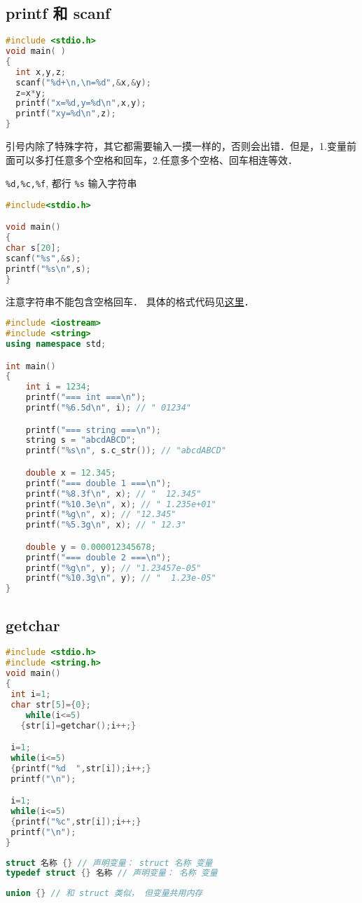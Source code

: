 

\begin{issues}
\issueDraft
\end{issues}

\subsection{printf 和 scanf}
\begin{lstlisting}[language=cpp]
#include <stdio.h>
void main( )
{
  int x,y,z;
  scanf("%d+\n,\n=%d",&x,&y);
  z=x*y;
  printf("x=%d,y=%d\n",x,y);
  printf("xy=%d\n",z);
}
\end{lstlisting}
引号内除了特殊字符，其它都需要输入一摸一样的，否则会出错．但是，1.变量前面可以多打任意多个空格和回车，2.任意多个空格、回车相连等效．
 
\verb|%d,%c,%f|, 都行 \verb|%s| 输入字符串
\begin{lstlisting}[language=cpp]
#include<stdio.h>

void main()
{
char s[20];
scanf("%s",&s);
printf("%s\n",s);
}
\end{lstlisting}
注意字符串不能包含空格回车． 具体的格式代码见\href{https://www.tutorialspoint.com/c_standard_library/c_function_printf.htm}{这里}．

\begin{lstlisting}[language=cpp]
#include <iostream>
#include <string>
using namespace std;

int main()
{
	int i = 1234;
	printf("=== int ===\n");
	printf("%6.5d\n", i); // " 01234"

	printf("=== string ===\n");
	string s = "abcdABCD";
	printf("%s\n", s.c_str()); // "abcdABCD"

	double x = 12.345;
	printf("=== double 1 ===\n");
	printf("%8.3f\n", x); // "  12.345"
	printf("%10.3e\n", x); // " 1.235e+01"
	printf("%g\n", x); // "12.345"
	printf("%5.3g\n", x); // " 12.3"

	double y = 0.000012345678;
	printf("=== double 2 ===\n");
	printf("%g\n", y); // "1.23457e-05"
	printf("%10.3g\n", y); // "  1.23e-05"
}
\end{lstlisting}

\subsection{getchar}
\begin{lstlisting}[language=cpp]
#include <stdio.h>
#include <string.h>
void main()
{
 int i=1;
 char str[5]={0};
    while(i<=5)
   {str[i]=getchar();i++;}

 i=1;
 while(i<=5)
 {printf("%d  ",str[i]);i++;}
 printf("\n");

 i=1;
 while(i<=5)
 {printf("%c",str[i]);i++;}
 printf("\n");
}
\end{lstlisting}

\begin{lstlisting}[language=cpp]
struct 名称 {} // 声明变量： struct 名称 变量
typedef struct {} 名称 // 声明变量： 名称 变量
\end{lstlisting}

\begin{lstlisting}[language=cpp]
union {} // 和 struct 类似， 但变量共用内存
\end{lstlisting}
